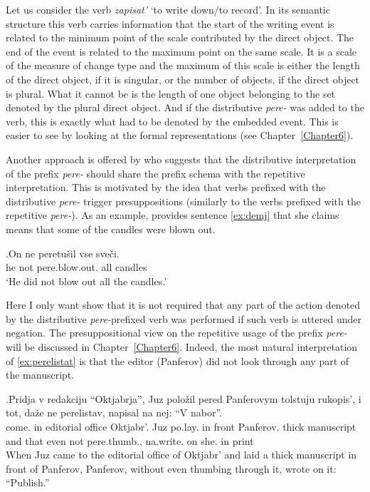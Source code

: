 Let us consider the verb \textit{zapisat'} `to write down/to record'. In its semantic structure this verb carries information that the start of the writing event is related to the minimum point of the scale contributed by the direct object. The end of the event is related to the maximum point on the same scale. It is a scale of the measure of change type and the maximum of this scale is either the length of the direct object, if it is singular, or the number of objects, if the direct object is plural. What it cannot be is the length of one object belonging to the set denoted by the plural direct object. And if the distributive \textit{pere-} was added to the verb, this is exactly what had to be denoted by the embedded event. This is easier to see by looking at the formal representations (see Chapter~\ref{Chapter6}).

Another approach is offered by \citet{Demjjanow:97} who suggests that the distributive interpretation of the prefix \textit{pere-} should share the prefix schema with the repetitive interpretation. This is motivated by the idea that verbs prefixed with the distributive \textit{pere-} trigger presuppositions (similarly to the verbs prefixed with the repetitive \textit{pere-}). As an example, \citet{Demjjanow:97} provides sentence \ref{ex:demj} that she claims means that some of the candles were blown out.

\exg.\label{ex:demj}On ne peretu\v{s}il vse sve\v{c}i.\\
he not pere.blow.out. all candles\\
\trans `He did not blow out all the candles.'\\

Here I only want show that it is not required that any part of the action denoted by the distributive \textit{pere-}prefixed verb was performed if such verb is uttered under negation. The presuppositional view on the repetitive usage of the prefix \textit{pere-} will be discussed in Chapter~\ref{Chapter6}. Indeed, the most natural interpretation of \ref{ex:perelistat} is that the editor (Panferov) did not look through any part of the manuscript.

\exg.\label{ex:perelistat}Pridja v redakciju ``Oktjabrja'', Juz polo\v{z}il pered Panferovym tolstuju rukopis', i tot, da\v{z}e ne perelistav, napisal na nej: ``V nabor''.\\
come. in {editorial office} Oktjabr'. Juz po.lay. {in front} Panferov. thick manuscript and that even not pere.thumb., na.write. on she. in 	print\\
\vspace{0.5em}
When Juz came to the editorial office of Oktjabr' and laid a thick manuscript in front of Panferov, Panferov, without even thumbing through it, wrote on it: ``Publish.''



